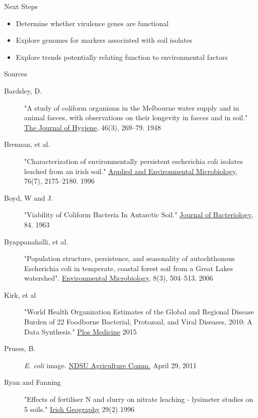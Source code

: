 \documentclass[17pt,aspectratio=169]{beamer}
\begin{document}
\begin{frame}[label=sec-18]{Next Steps}
\begin{itemize}
\item Determine whether virulence genes are functional
\item Explore genomes for markers associated with soil isolates
\item Explore trends potentially relating function to environmental factors
\end{itemize}
\end{frame}


\begin{frame}[label=sec-19]{Sources}
\tiny
\begin{description}
\item[{Bardsley, D.}] "A study of coliform organisms in the Melbourne water supply and in animal faeces, with observations on their longevity in faeces and in soil." \uline{The Journal of Hygiene}, 46(3), 269–79. 1948
\item[{Brennan, et al.}] "Characterization of environmentally persistent escherichia coli isolates leached from an irish soil." \uline{Applied and Environmental Microbiology}, 76(7), 2175–2180. 1996
\item[{Boyd, W and J.}] "Viability of Coliform Bacteria In Antarctic Soil." \uline{Journal of Bacteriology}, 84. 1963
\item[{Byappanahalli, et al.}] "Population structure, persistence, and seasonality of autochthonous Escherichia coli in temperate, coastal forest soil from a Great Lakes watershed". \uline{Environmental Microbiology}, 8(3), 504–513. 2006
\item[{Kirk, et al}] "World Health Organization Estimates of the Global and Regional Disease Burden of 22 Foodborne Bacterial, Protozoal, and Viral Diseases, 2010: A Data Synthesis." \uline{Plos Medicine} 2015
\item[{Pruess, B.}] \emph{E. coli} image. \uline{NDSU Agriculture Comm.} April 29, 2011
\item[{Ryan and Fanning}] "Effects of fertiliser N and slurry on nitrate leaching - lysimeter studies on 5 soils." \uline{Irish Geography}  29(2) 1996
\end{description}
\end{frame}
\end{document}
